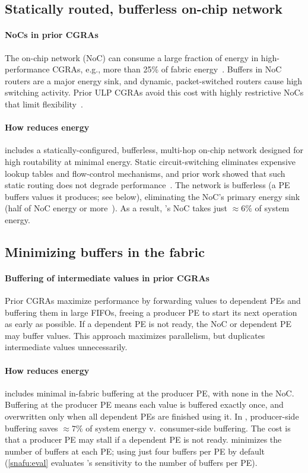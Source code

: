 \subsection{Statically routed, bufferless on-chip network}

\paragraph{NoCs in prior CGRAs}
%
The on-chip network (NoC) can consume a large fraction of energy in high-performance
CGRAs,
%
e.g., more than 25\% of fabric energy~\cite{nowatzki:isca17:stream-dataflow,karunaratne2017hycube}.
%
Buffers in NoC routers are a major energy sink, and dynamic, packet-switched
routers cause high switching activity.
%
Prior ULP CGRAs avoid this cost with highly restrictive NoCs that limit
flexibility~\cite{ipa,cma,srp}.

\paragraph{How \snafu reduces energy}
%
\snafuframe includes a statically-configured, bufferless, multi-hop on-chip
network designed for high routability at minimal energy.
% 
Static circuit-switching eliminates expensive lookup tables and flow-control
mechanisms, and prior work showed that such static routing does not degrade
performance~\cite{karunaratne2017hycube}.
%
The network is bufferless (a PE buffers values it produces; see below),
eliminating the NoC's primary energy sink 
(half of NoC energy or more~\cite{moscibroda2009case}).
  As a result, \snafu's NoC takes just $\approx 6\%$ of system energy.


\subsection{Minimizing buffers in the fabric}

\paragraph{Buffering of intermediate values in prior CGRAs}
%
Prior CGRAs maximize performance by forwarding values to dependent PEs
and buffering them in large FIFOs,
freeing a producer PE to start its next operation as early as possible.
%
If a dependent PE is not ready, the NoC or dependent PE may buffer values. 
%
This approach maximizes parallelism, but duplicates intermediate values unnecessarily.

\paragraph{How \snafu reduces energy}
%
\snafuframe includes minimal in-fabric buffering at the producer PE, with none
in the NoC.
%
Buffering at the producer PE means each value is buffered exactly once, and
overwritten only when all dependent PEs are finished using it.
%
In \snafuarch, producer-side buffering saves $\approx7\%$ of system energy
v.\ consumer-side buffering.
%
The cost is that a producer PE may stall if a dependent PE is not ready.
%
\snafuframe minimizes the number of buffers at each PE; using just four buffers per PE by default
(\autoref{snafu:eval} evaluates \snafuframe's sensitivity to the number of buffers per PE).
